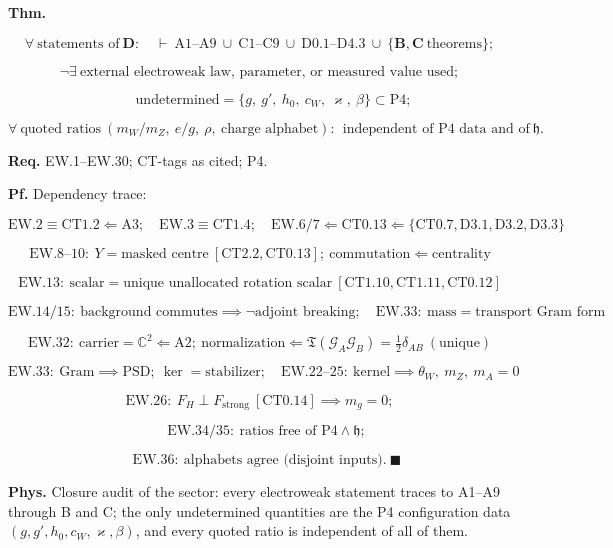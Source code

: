 \begin{theorem}\label{tag:EW-31}
\textbf{Thm.}

\[
\forall\ \text{statements of}\ \mathbf D:\quad\vdash\ \mathrm{A1\text{–}A9}\ \cup\ \mathrm{C1\text{–}C9}\ \cup\ \mathrm{D0.1\text{–}D4.3}\ \cup\ \{\mathbf B,\mathbf C\ \text{theorems}\};
\]

\[
\neg\exists\ \text{external electroweak law, parameter, or measured value used};
\]

\[
\qquad \text{undetermined}=\{g,\ g',\ h_0,\ c_W,\ \varkappa,\ \beta\}\subset\mathrm{P4};
\]

\[
\forall\ \text{quoted ratios}\ (m_W/m_Z,\ e/g,\ \rho,\ \text{charge alphabet}):\ \ \text{independent of P4 data and of}\ \mathfrak h .
\]

\textbf{Req.} EW.1–EW.30; CT-tags as cited; P4.

\textbf{Pf.} Dependency trace:

\[
\mathrm{EW.2}\equiv\mathrm{CT1.2}\Leftarrow\mathrm{A3};\quad
\mathrm{EW.3}\equiv\mathrm{CT1.4};\quad
\mathrm{EW.6/7}\Leftarrow\mathrm{CT0.13}\Leftarrow\{\mathrm{CT0.7},\mathrm{D3.1},\mathrm{D3.2},\mathrm{D3.3}\}
\]

\[
\mathrm{EW.8\text{–}10}:\ Y=\text{masked centre}\ [\mathrm{CT2.2},\mathrm{CT0.13}];\ \text{commutation}\Leftarrow\text{centrality}
\]

\[
\mathrm{EW.13}:\ \text{scalar}=\text{unique unallocated rotation scalar}\ [\mathrm{CT1.10},\mathrm{CT1.11},\mathrm{CT0.12}]
\]

\[
\mathrm{EW.14/15}:\ \text{background commutes}\implies\neg\text{adjoint breaking};\quad
\mathrm{EW.33}:\ \text{mass}=\text{transport Gram form}
\]

\[
\mathrm{EW.32}:\ \text{carrier}=\mathbb C^2\Leftarrow\mathrm{A2};\ \text{normalization}\Leftarrow\mathfrak T(\mathcal G_A\mathcal G_B)=\tfrac12\delta_{AB}\ (\text{unique})
\]

\[
\mathrm{EW.33}:\ \text{Gram}\implies\text{PSD};\ \ker=\text{stabilizer};\quad
\mathrm{EW.22\text{–}25}:\ \text{kernel}\implies\theta_W,\ m_Z,\ m_A=0
\]

\[
\mathrm{EW.26}:\ F_H\perp F_{\mathrm{strong}}\ [\mathrm{CT0.14}]\implies m_g=0;
\]

\[
\quad \mathrm{EW.34/35}:\ \text{ratios free of P4}\wedge\mathfrak h;
\]

\[
\quad \mathrm{EW.36}:\ \text{alphabets agree (disjoint inputs)}.\ \blacksquare
\]

\textbf{Phys.} Closure audit of the sector: every electroweak statement traces to A1–A9 through B and C; the only undetermined quantities are the P4 configuration data $(g,g',h_0,c_W,\varkappa,\beta)$, and every quoted ratio is independent of all of them.

\end{theorem}

